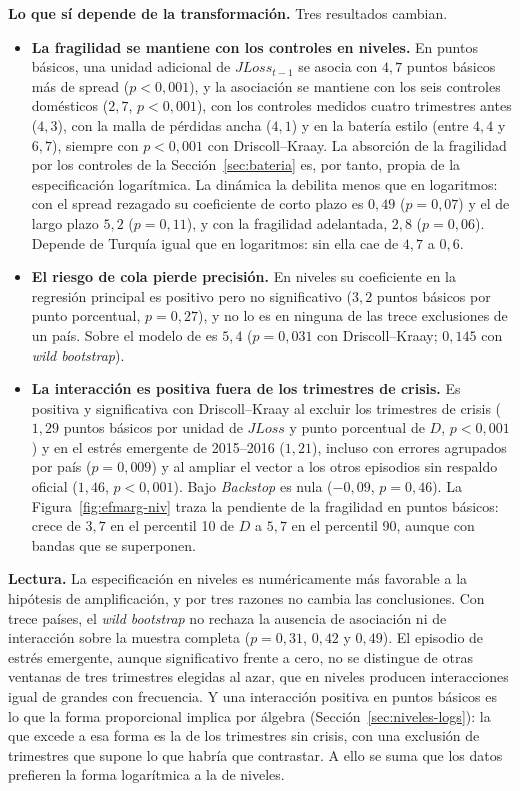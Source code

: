 \textbf{Lo que sí depende de la transformación.} Tres resultados cambian.
\begin{itemize}
    \item \textbf{La fragilidad se mantiene con los controles en niveles.} En puntos básicos, una unidad adicional de $JLoss_{t-1}$ se asocia con $4{,}7$ puntos básicos más de spread ($p<0{,}001$), y la asociación se mantiene con los seis controles domésticos ($2{,}7$, $p<0{,}001$), con los controles medidos cuatro trimestres antes ($4{,}3$), con la malla de pérdidas ancha ($4{,}1$) y en la batería estilo \citet{Chari2024b} (entre $4{,}4$ y $6{,}7$), siempre con $p<0{,}001$ con Driscoll--Kraay. La absorción de la fragilidad por los controles de la Sección~\ref{sec:bateria} es, por tanto, propia de la especificación logarítmica. La dinámica la debilita menos que en logaritmos: con el spread rezagado su coeficiente de corto plazo es $0{,}49$ ($p=0{,}07$) y el de largo plazo $5{,}2$ ($p=0{,}11$), y con la fragilidad adelantada, $2{,}8$ ($p=0{,}06$). Depende de Turquía igual que en logaritmos: sin ella cae de $4{,}7$ a $0{,}6$.
    \item \textbf{El riesgo de cola pierde precisión.} En niveles su coeficiente en la regresión principal es positivo pero no significativo ($3{,}2$ puntos básicos por punto porcentual, $p=0{,}27$), y no lo es en ninguna de las trece exclusiones de un país. Sobre el modelo de \citet{Chari2024b} es $5{,}4$ ($p=0{,}031$ con Driscoll--Kraay; $0{,}145$ con \textit{wild bootstrap}).
    \item \textbf{La interacción es positiva fuera de los trimestres de crisis.} Es positiva y significativa con Driscoll--Kraay al excluir los trimestres de crisis ($1{,}29$ puntos básicos por unidad de $JLoss$ y punto porcentual de $D$, $p<0{,}001$) y en el estrés emergente de 2015--2016 ($1{,}21$), incluso con errores agrupados por país ($p=0{,}009$) y al ampliar el vector a los otros episodios sin respaldo oficial ($1{,}46$, $p<0{,}001$). Bajo \textit{Backstop} es nula ($-0{,}09$, $p=0{,}46$). La Figura~\ref{fig:efmarg-niv} traza la pendiente de la fragilidad en puntos básicos: crece de $3{,}7$ en el percentil 10 de $D$ a $5{,}7$ en el percentil 90, aunque con bandas que se superponen.
\end{itemize}

\textbf{Lectura.} La especificación en niveles es numéricamente más favorable a la hipótesis de amplificación, y por tres razones no cambia las conclusiones. Con trece países, el \textit{wild bootstrap} no rechaza la ausencia de asociación ni de interacción sobre la muestra completa ($p=0{,}31$, $0{,}42$ y $0{,}49$). El episodio de estrés emergente, aunque significativo frente a cero, no se distingue de otras ventanas de tres trimestres elegidas al azar, que en niveles producen interacciones igual de grandes con frecuencia. Y una interacción positiva en puntos básicos es lo que la forma proporcional implica por álgebra (Sección~\ref{sec:niveles-logs}): la que excede a esa forma es la de los trimestres sin crisis, con una exclusión de trimestres que supone lo que habría que contrastar. A ello se suma que los datos prefieren la forma logarítmica a la de niveles.

